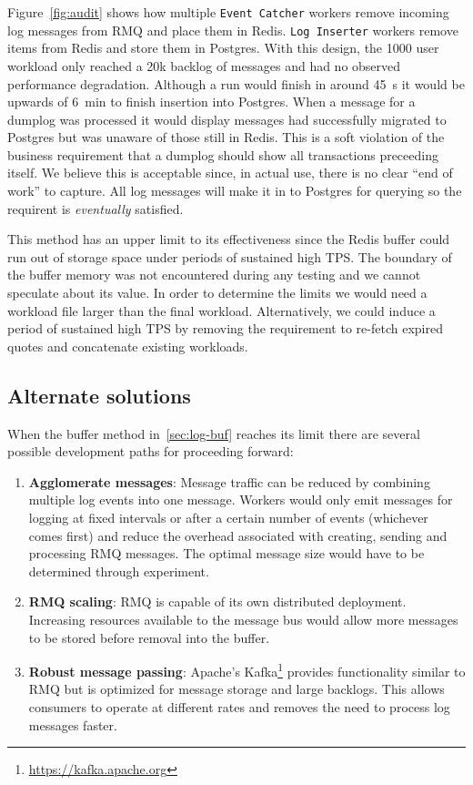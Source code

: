 Figure~\ref{fig:audit} shows how multiple \texttt{Event Catcher} workers remove incoming log messages from RMQ and place them in Redis. \texttt{Log Inserter} workers remove items from Redis and store them in Postgres.
With this design, the 1000 user workload only reached a 20k backlog of messages and had no observed performance degradation.
Although a run would finish in around \SI{45}{\second} it would be upwards of \SI{6}{\minute} to finish insertion into Postgres.
When a message for a dumplog was processed it would display messages had successfully migrated to Postgres but was unaware of those still in Redis.
This is a soft violation of the business requirement that a dumplog should show all transactions preceeding itself.
We believe this is acceptable since, in actual use, there is no clear ``end of work'' to capture.
All log messages will make it in to Postgres for querying so the requirent is \textit{eventually} satisfied.

This method has an upper limit to its effectiveness since the Redis buffer could run out of storage space under periods of sustained high TPS.
The boundary of the buffer memory was not encountered during any testing and we cannot speculate about its value.
In order to determine the limits we would need a workload file larger than the final workload.
Alternatively, we could induce a period of sustained high TPS by removing the requirement to re-fetch expired quotes and concatenate existing workloads.

\subsection{Alternate solutions}
When the buffer method in~\ref{sec:log-buf} reaches its limit there are several possible development paths for proceeding forward:

\begin{enumerate}
  \item \textbf{Agglomerate messages}: Message traffic can be reduced by combining multiple log events into one message.
Workers would only emit messages for logging at fixed intervals or after a certain number of events (whichever comes first) and reduce the overhead associated with creating, sending and processing RMQ messages.
The optimal message size would have to be determined through experiment.
  \item \textbf{RMQ scaling}: RMQ is capable of its own distributed deployment.
Increasing resources available to the message bus would allow more messages to be stored before removal into the buffer.
  \item \textbf{Robust message passing}: Apache's Kafka\footnote{\url{https://kafka.apache.org}} provides functionality similar to RMQ but is optimized for message storage and large backlogs.
This allows consumers to operate at different rates and removes the need to process log messages faster.
\end{enumerate}
